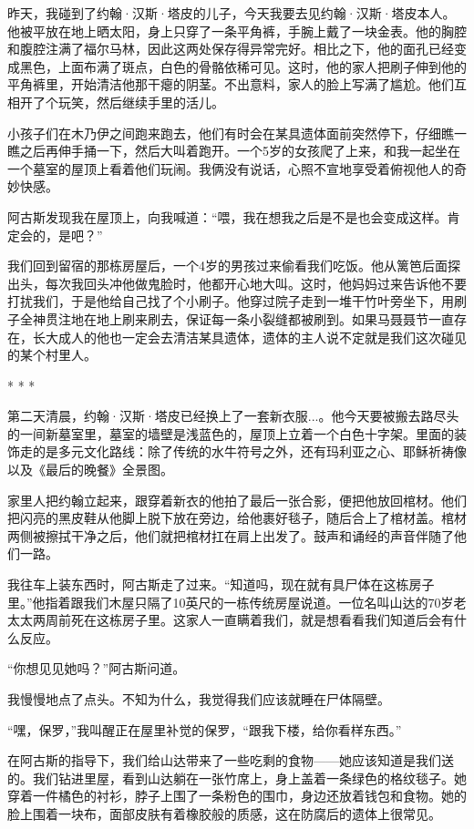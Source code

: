 \documentclass[12pt,oneside]{book}
\begin{document}
\begin{bookref}[frametitle={\cite{好好告别}}]
昨天，我碰到了约翰·汉斯·塔皮的儿子，今天我要去见约翰·汉斯·塔皮本人。他被平放在地上晒太阳，身上只穿了一条平角裤，手腕上戴了一块金表。他的胸腔和腹腔注满了福尔马林，因此这两处保存得异常完好。相比之下，他的面孔已经变成黑色，上面布满了斑点，白色的骨骼依稀可见。这时，他的家人把刷子伸到他的平角裤里，开始清洁他那干瘪的阴茎。不出意料，家人的脸上写满了尴尬。他们互相开了个玩笑，然后继续手里的活儿。

小孩子们在木乃伊之间跑来跑去，他们有时会在某具遗体面前突然停下，仔细瞧一瞧之后再伸手捅一下，然后大叫着跑开。一个5岁的女孩爬了上来，和我一起坐在一个墓室的屋顶上看着他们玩闹。我俩没有说话，心照不宣地享受着俯视他人的奇妙快感。

阿古斯发现我在屋顶上，向我喊道：“喂，我在想我之后是不是也会变成这样。肯定会的，是吧？”

我们回到留宿的那栋房屋后，一个4岁的男孩过来偷看我们吃饭。他从篱笆后面探出头，每次我回头冲他做鬼脸时，他都开心地大叫。这时，他妈妈过来告诉他不要打扰我们，于是他给自己找了个小刷子。他穿过院子走到一堆干竹叶旁坐下，用刷子全神贯注地在地上刷来刷去，保证每一条小裂缝都被刷到。如果马聂聂节一直存在，长大成人的他也一定会去清洁某具遗体，遗体的主人说不定就是我们这次碰见的某个村里人。

\begin{center}
* * *
\end{center}

第二天清晨，约翰·汉斯·塔皮已经换上了一套新衣服...。他今天要被搬去路尽头的一间新墓室里，墓室的墙壁是浅蓝色的，屋顶上立着一个白色十字架。里面的装饰走的是多元文化路线：除了传统的水牛符号之外，还有玛利亚之心、耶稣祈祷像以及《最后的晚餐》全景图。

家里人把约翰立起来，跟穿着新衣的他拍了最后一张合影，便把他放回棺材。他们把闪亮的黑皮鞋从他脚上脱下放在旁边，给他裹好毯子，随后合上了棺材盖。棺材两侧被擦拭干净之后，他们就把棺材扛在肩上出发了。鼓声和诵经的声音伴随了他们一路。

我往车上装东西时，阿古斯走了过来。“知道吗，现在就有具尸体在这栋房子里。”他指着跟我们木屋只隔了10英尺的一栋传统房屋说道。一位名叫山达的70岁老太太两周前死在这栋房子里。这家人一直瞒着我们，就是想看看我们知道后会有什么反应。

“你想见见她吗？”阿古斯问道。

我慢慢地点了点头。不知为什么，我觉得我们应该就睡在尸体隔壁。

“嘿，保罗，”我叫醒正在屋里补觉的保罗，“跟我下楼，给你看样东西。”

在阿古斯的指导下，我们给山达带来了一些吃剩的食物——她应该知道是我们送的。我们钻进里屋，看到山达躺在一张竹席上，身上盖着一条绿色的格纹毯子。她穿着一件橘色的衬衫，脖子上围了一条粉色的围巾，身边还放着钱包和食物。她的脸上围着一块布，面部皮肤有着橡胶般的质感，这在防腐后的遗体上很常见。


\end{bookref}
\end{document}

